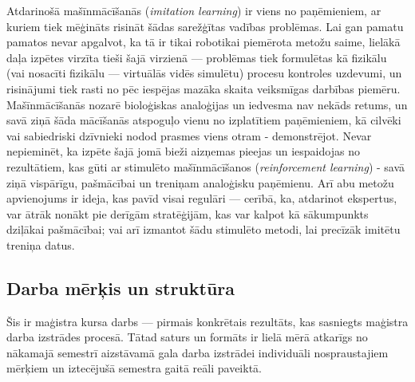 \documentclass[12pt, a4paper]{article}
\numberwithin{equation}{section} %
\begin{document}
Atdarinošā mašīnmācīšanās (\textit{imitation learning}) ir viens no paņēmieniem, ar kuriem tiek mēģināts risināt šādas sarežģītas vadības problēmas. Lai gan pamatu pamatos nevar apgalvot, ka tā ir tikai robotikai piemērota metožu saime, lielākā daļa izpētes virzīta tieši šajā virzienā --- problēmas tiek formulētas kā fizikālu (vai nosacīti fizikālu --- virtuālās vidēs simulētu) procesu kontroles uzdevumi, un risinājumi tiek rasti no pēc iespējas mazāka skaita veiksmīgas darbības piemēru. Mašīnmācīšanās nozarē bioloģiskas analoģijas un iedvesma nav nekāds retums, un savā ziņā šāda mācīšanās  atspoguļo vienu no izplatītiem paņēmieniem, kā cilvēki vai sabiedriski dzīvnieki nodod prasmes viens otram - demonstrējot. Nevar nepieminēt, ka izpēte šajā jomā bieži aizņemas pieejas un iespaidojas no rezultātiem, kas gūti ar stimulēto mašīnmācīšanos (\textit{reinforcement learning}) - savā ziņā vispārīgu, pašmācībai un treniņam analoģisku paņēmienu. Arī abu metožu apvienojums ir ideja, kas pavīd visai regulāri --- cerībā, ka, atdarinot ekspertus, var ātrāk nonākt pie derīgām stratēģijām, kas var kalpot kā sākumpunkts dziļākai pašmācībai; vai arī izmantot šādu stimulēto metodi, lai precīzāk imitētu treniņa datus.


\subsection{Darba mērķis un struktūra}

Šis ir maģistra kursa darbs --- pirmais konkrētais rezultāts, kas sasniegts maģistra darba izstrādes procesā. Tātad saturs un formāts ir lielā mērā atkarīgs no nākamajā semestrī aizstāvamā gala darba izstrādei individuāli nospraustajiem mērķiem un iztecējušā semestra gaitā reāli paveiktā. 
\end{document}
